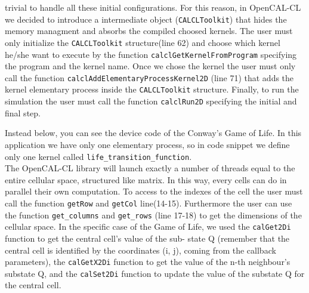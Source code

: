 trivial to handle all these initial configurations.  For this reason,
in OpenCAL-CL we decided to introduce a intermediate object
(\verb'CALCLToolkit') that hides the memory managment and absorbs the
compiled choosed kernels. The user must only initialize the
\verb'CALCLToolkit' structure(line 62) and choose which kernel he/she
want to execute by the function \verb'calclGetKernelFromProgram'
specifying the program and the kernel name. Once we chose the kernel
the user must only call the function
\verb'calclAddElementaryProcessKernel2D' (line 71) that adds the
kernel elementary process inside the \verb'CALCLToolkit'
structure. Finally, to run the simulation the user must call the function
\verb'calclRun2D' specifying the initial and final step.

Instead below, you can see the device code of the Conway’s Game of
Life.  In this application we have only one elementary process, so in
code snippet we define only one kernel called
\verb'life_transition_function'.\\ The OpenCAL-CL library will launch
exactly a number of threads equal to the entire cellular space,
structured like matrix. In this way, every cells can do in parallel
their own computation.  To access to the indexes of the cell the user
must call the function \verb'getRow' and \verb'getCol'
line(14-15). Furthermore the user can use the function
\verb'get_columns' and \verb'get_rows' (line 17-18) to get the
dimensions of the cellular space.  In the specific case of the Game of
Life, we used the \verb'calGet2Di' function to get the central cell’s value of the sub-
state Q (remember that the central cell is identified by the coordinates (i, j), coming from the callback parameters), the \verb'calGetX2Di' function to get the value
of the n-th neighbour’s substate Q, and the \verb'calSet2Di' function to update the
value of the substate Q for the central cell. 



 